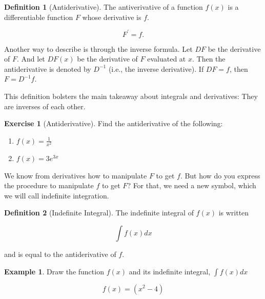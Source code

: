 \documentclass[
]{book}
\providecommand{\tightlist}{%
  \setlength{\itemsep}{0pt}\setlength{\parskip}{0pt}}
\theoremstyle{definition}
\newtheorem{definition}{Definition}[chapter]
\theoremstyle{definition}
\newtheorem{example}{Example}[chapter]
\theoremstyle{definition}
\newtheorem{exercise}{Exercise}[chapter]
\theoremstyle{definition}
\theoremstyle{remark}
\begin{document}
\begin{definition}[Antiderivative]
\protect\hypertarget{def:unnamed-chunk-207}{}{\label{def:unnamed-chunk-207} {} }The antiverivative of a function \(f(x)\) is a differentiable function \(F\) whose derivative is \(f\).

\[F^\prime = f.\]
\end{definition}

Another way to describe is through the inverse formula. Let \(DF\) be the derivative of \(F\). And let \(DF(x)\) be the derivative of \(F\) evaluated at \(x\). Then the antiderivative is denoted by \(D^{-1}\) (i.e., the inverse derivative). If \(DF=f\), then \(F=D^{-1}f\).

This definition bolsters the main takeaway about integrals and derivatives: They are inverses of each other.

\begin{exercise}[Antiderivative]
\protect\hypertarget{exr:unnamed-chunk-208}{}{\label{exr:unnamed-chunk-208} {} }Find the antiderivative of the following:

\begin{enumerate}
\def\labelenumi{\arabic{enumi}.}
\tightlist
\item
  \(f(x) = \frac{1}{x^2}\)
\item
  \(f(x) = 3e^{3x}\)
\end{enumerate}
\end{exercise}

We know from derivatives how to manipulate \(F\) to get \(f\). But how do you express the procedure to manipulate \(f\) to get \(F\)? For that, we need a new symbol, which we will call indefinite integration.

\begin{definition}[Indefinite Integral]
\protect\hypertarget{def:unnamed-chunk-209}{}{\label{def:unnamed-chunk-209} {} }The indefinite integral of \(f(x)\) is written

\[\int f(x) dx \]

and is equal to the antiderivative of \(f\).
\end{definition}

\begin{example}
\protect\hypertarget{exm:unnamed-chunk-210}{}{\label{exm:unnamed-chunk-210} }Draw the function \(f(x)\) and its indefinite integral, \(\int\limits f(x) dx\)

\[f(x) = (x^2-4)\]
\end{example}
\end{document}
